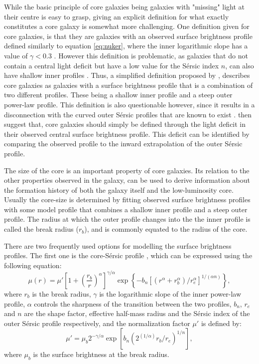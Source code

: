 \documentclass[english, twoside]{HYgradu}
\begin{document}
While the basic principle of core galaxies being galaxies with "missing" light at their centre is easy to grasp, giving an explicit definition for what exactly constitutes a core galaxy is somewhat more challenging. One definition given for core galaxies, is that they are galaxies with an observed surface brightness profile defined similarly to equation \ref{eq:nuker}, where the inner logarithmic slope has a value of $\gamma < 0.3$ \citep{Lauer1995, Lauer2007}. However this definition is problematic, as galaxies that do not contain a central light deficit but have a low value for the Sérsic index $n$, can also have shallow inner profiles \citep{Graham2003}. Thus, a simplified definition proposed by \cite{Kormendy1999}, describes core galaxies as galaxies with a surface brightness profile that is a combination of two different profiles. These being a shallow inner profile and a steep outer power-law profile. This definition is also questionable however, since it results in a disconnection with the curved outer Sérsic profiles that are known to exist \citep{Dullo2012}. \cite{Graham2003} then suggest that, core galaxies should simply be defined through the light deficit in their observed central surface brightness profile. This deficit can be identified by comparing the observed profile to the inward extrapolation of the outer Sérsic profile.

The size of the core is an important property of core galaxies. Its relation to the other properties observed in the galaxy, can be used to derive information about the formation history of both the galaxy itself and the low-luminosity core. Usually the core-size is determined by fitting observed surface brightness profiles with some model profile that combines a shallow inner profile and a steep outer profile. The radius at which the outer profile changes into the the inner profile is called the break radius ($r_b$), and is commonly equated to the radius of the core.

There are two frequently used options for modelling the surface brightness profiles. The first one is the core-Sérsic profile \citep{Graham2003}, which can be expressed using the following equation:
\begin{equation}
\mu(r) = \mu' \left[ 1 + \left( \frac{r_b}{r} \right)^\alpha \right]^{\gamma / \alpha} \exp \left\lbrace -b_n \left[ \left( r^\alpha + r_b^\alpha \right) / r_e^\alpha \right]^{1/(\alpha n)} \right\rbrace, \label{eq:core-sersic}
\end{equation}
where $r_b$ is the break radius, $\gamma$ is the logarithmic slope of the inner power-law profile, $\alpha$ controls the sharpness of the transition between the two profiles, $b_n$, $r_e$ and $n$ are the shape factor, effective half-mass radius and the Sérsic index of the outer Sérsic profile respectively, and the normalization factor $\mu'$ is defined by:
\begin{equation}
\mu' = \mu_b 2^{-\gamma/\alpha} \exp \left[ b_n \left( 2^{(1/\alpha)} r_b/r_e \right)^{1/n} \right], 
\label{eq:mu_dot}
\end{equation}
where $\mu_b$ is the surface brightness at the break radius. 
\end{document}
